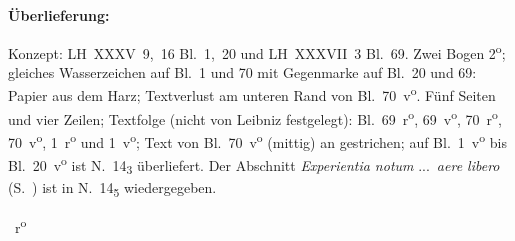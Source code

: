 %
%
%
%
\frenchspacing%
%
\begin{ledgroupsized}[r]{120mm}
\footnotesize
\pstart
\noindent\textbf{Überlieferung:}
\pend
\end{ledgroupsized}
\begin{ledgroupsized}[r]{114mm}
\footnotesize
\pstart \parindent -6mm
%
Konzept: LH~XXXV~9,~16 Bl.~1,~20 und LH~XXXVII~3 Bl.~69.
Zwei Bogen 2\textsuperscript{o};
gleiches Wasserzeichen auf Bl.~1 und 70 mit Gegenmarke auf Bl.~20 und 69:
Papier aus dem Harz;
Textverlust am unteren Rand von Bl.~70~v\textsuperscript{o}.
Fünf Seiten und vier Zeilen;
Textfolge (nicht von Leibniz festgelegt):
Bl.~69~r\textsuperscript{o}, 69~v\textsuperscript{o}, 70~r\textsuperscript{o}, 70~v\textsuperscript{o}, 1~r\textsuperscript{o} und 1~v\textsuperscript{o};
Text von Bl.~70~v\textsuperscript{o} (mittig) an gestrichen; %
auf Bl.~1~v\textsuperscript{o} bis Bl.~20~v\textsuperscript{o} ist N.~14\textsubscript{3} überliefert.
Der Abschnitt \textit{Experientia notum} \lbrack...\rbrack\ \textit{aere libero} (S.~) ist in N.~14\textsubscript{5} %
wiedergegeben.
\pend
\end{ledgroupsized}
%
%
%
\frenchspacing%
%
%
\vspace{8mm}
%
%
\count{}
\count{}
\count{}
%
% 
\pstart%
\normalsize%
\noindent%
%
~r\textsuperscript{o}\rbrack\ %
%
\pend%
%
\pstart%
\centering%
